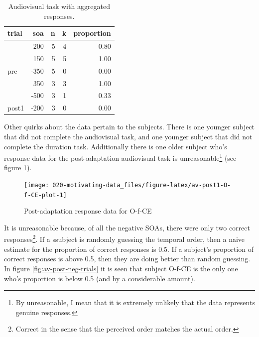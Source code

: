 \documentclass[11pt, oneside, openany]{scrbook}
\begin{document}
\begin{table}[!h]

\caption{\label{tab:av-bin-sample}Audiovisual task with aggregated responses.}
\centering
\begin{tabular}[t]{lrrrr}
\toprule
trial & soa & n & k & proportion\\
\midrule
 & 200 & 5 & 4 & 0.80\\
\cmidrule{2-5}
 & 150 & 5 & 5 & 1.00\\
\cmidrule{2-5}
\multirow[t]{-3}{*}{\raggedright\arraybackslash pre} & -350 & 5 & 0 & 0.00\\
\cmidrule{1-5}
 & 350 & 3 & 3 & 1.00\\
\cmidrule{2-5}
 & -500 & 3 & 1 & 0.33\\
\cmidrule{2-5}
\multirow[t]{-3}{*}{\raggedright\arraybackslash post1} & -200 & 3 & 0 & 0.00\\
\bottomrule
\end{tabular}
\end{table}

Other quirks about the data pertain to the subjects. There is one younger subject that did not complete the audiovisual task, and one younger subject that did not complete the duration task. Additionally there is one older subject who's response data for the post-adaptation audiovisual task is unreasonable\footnote{By unreasonable, I mean that it is extremely unlikely that the data represents genuine responses.} (see figure \ref{fig:av-post1-O-f-CE-plot}).

\begin{figure}

{\centering \texttt{[image: 020-motivating-data\_files/figure-latex/av-post1-O-f-CE-plot-1]} 

}

\caption{Post-adaptation response data for O-f-CE}\label{fig:av-post1-O-f-CE-plot}
\end{figure}

It is unreasonable because, of all the negative SOAs, there were only two correct responses\footnote{Correct in the sense that the perceived order matches the actual order.}. If a ssubject is randomly guessing the temporal order, then a naive estimate for the proportion of correct responses is 0.5. If a subject's proportion of correct responses is above 0.5, then they are doing better than random guessing. In figure \ref{fig:av-post-neg-trials} it is seen that subject O-f-CE is the only one who's proportion is below 0.5 (and by a considerable amount).
\end{document}
